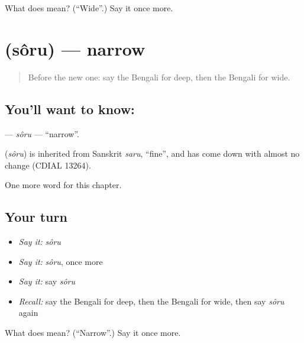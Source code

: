 \begin{tcolorbox}[breakable,colback=teal!4,colframe=teal!35!black,title={Before you move on}]
What does  mean? (\textquotedblleft{}Wide\textquotedblright{}.) Say it once more.
\end{tcolorbox}
\section[\texorpdfstring{\bn{সরু} (sôru)}{সরু (sôru)}]{ (sôru) — narrow}

\label{lesson:BN-C136-soru}



\begin{quote}
Before the new one: say the Bengali for deep, then the Bengali for wide.
\end{quote}

\subsection*{You'll want to know: }
\textbf{} — \emph{sôru} — \textquotedblleft{}narrow\textquotedblright{}.

\begin{cousinweb}
\textbf{} (\emph{sôru}) is inherited from Sanskrit \emph{saru}, \textquotedblleft{}fine\textquotedblright{}, and has come down with almost no change (CDIAL 13264).
\end{cousinweb}

\begin{grammarlens}[title={What you've built}]
One more word for this chapter.
\end{grammarlens}

\subsection*{Your turn}
\begin{itemize}
\raggedright
  \item \emph{Say it:} \emph{sôru}
  \item \emph{Say it:} \emph{sôru}, once more
  \item \emph{Say it:} say \emph{sôru}
  \item \emph{Recall:} say the Bengali for deep, then the Bengali for wide, then say \emph{sôru} again
\end{itemize}

\begin{tcolorbox}[breakable,colback=teal!4,colframe=teal!35!black,title={Before you move on}]
What does  mean? (\textquotedblleft{}Narrow\textquotedblright{}.) Say it once more.
\end{tcolorbox}
